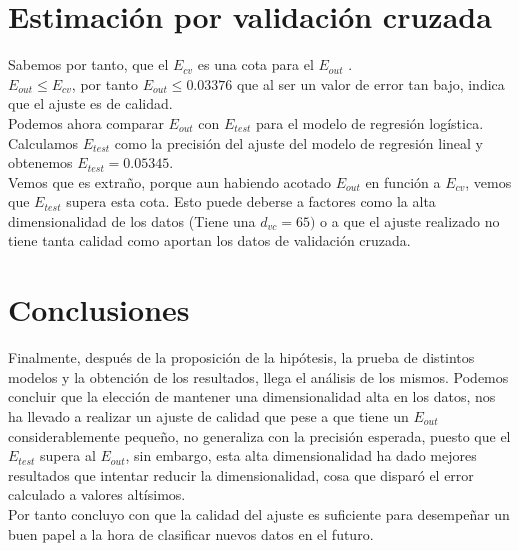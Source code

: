 \section{Estimación por validación cruzada}
Sabemos por tanto, que el $E_{cv}$ es una cota para el $E_{out}$ \cite{Cota}.\\
$E_{out} \leq E_{cv}$, por tanto $E_{out} \leq 0.03376$ que al ser un valor de error tan bajo, indica que el ajuste es de calidad.\\
Podemos ahora comparar $E_{out}$ con $E_{test}$ para el modelo de regresión logística. Calculamos $E_{test}$ como la precisión del ajuste del modelo de regresión lineal y obtenemos $E_{test}=0.05345$.
\\
Vemos que es extraño, porque aun habiendo acotado $E_{out}$ en función a $E_{cv}$, vemos que $E_{test}$ supera esta cota. Esto puede deberse a factores como la alta dimensionalidad de los datos (Tiene una $d_{vc} = 65)$ o a que el ajuste realizado no tiene tanta calidad como aportan los datos de validación cruzada.

\section{Conclusiones}
Finalmente, después de la proposición de la hipótesis, la prueba de distintos modelos y la obtención de los resultados, llega el análisis de los mismos. Podemos concluir que la elección de mantener una dimensionalidad alta en los datos, nos ha llevado a realizar un ajuste de calidad que pese a que tiene un $E_{out}$ considerablemente pequeño, no generaliza con la precisión esperada, puesto que el $E_{test}$ supera al $E_{out}$, sin embargo, esta alta dimensionalidad ha dado mejores resultados que intentar reducir la dimensionalidad, cosa que disparó el error calculado a valores altísimos.\\
Por tanto concluyo con que la calidad del ajuste es suficiente para desempeñar un buen papel a la hora de clasificar nuevos datos en el futuro.
